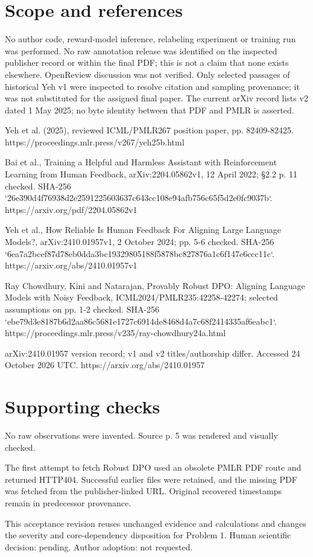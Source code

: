 \documentclass[10pt]{article}
\begin{document}
\section*{Scope and references}
No author code, reward-model inference, relabeling experiment or training run was performed. No raw annotation release was identified on the inspected publisher record or within the final PDF; this is not a claim that none exists elsewhere. OpenReview discussion was not verified. Only selected passages of historical Yeh v1 were inspected to resolve citation and sampling provenance; it was not substituted for the assigned final paper. The current arXiv record lists v2 dated 1 May 2025; no byte identity between that PDF and PMLR is asserted.\par
[S1] Yeh et al. (2025), reviewed ICML/PMLR267 position paper, pp. 82409-82425.
https://proceedings.mlr.press/v267/yeh25b.html\par
[S2] Bai et al., Training a Helpful and Harmless Assistant with Reinforcement Learning from Human Feedback, arXiv:2204.05862v1, 12 April 2022; §2.2 p. 11 checked. SHA-256 `26e390d4f76938d2e2591225603637c643cc108e94afb756c65f5d2e0fc9037b`.
https://arxiv.org/pdf/2204.05862v1\par
[S3] Yeh et al., How Reliable Is Human Feedback For Aligning Large Language Models?, arXiv:2410.01957v1, 2 October 2024; pp. 5-6 checked. SHA-256 `6ea7a2bcef87d78eb0dda3bc19329805188f5878bc827876a1c6f147e6ccc11c`.
https://arxiv.org/abs/2410.01957v1\par
[S4] Ray Chowdhury, Kini and Natarajan, Provably Robust DPO: Aligning Language Models with Noisy Feedback, ICML2024/PMLR235:42258-42274; selected assumptions on pp. 1-2 checked. SHA-256 `ebe79d3e8187b6d2aa86c5681e1727c6914de8468d4a7c68f2414335af6eabc1`.
https://proceedings.mlr.press/v235/ray-chowdhury24a.html\par
[S5] arXiv:2410.01957 version record; v1 and v2 titles/authorship differ. Accessed 24 October 2026 UTC.
https://arxiv.org/abs/2410.01957\par
\section*{Supporting checks}
No raw observations were invented. Source p. 5 was rendered and visually checked.\par
The first attempt to fetch Robust DPO used an obsolete PMLR PDF route and returned HTTP404. Successful earlier files were retained, and the missing PDF was fetched from the publisher-linked URL. Original recovered timestamps remain in predecessor provenance.\par
This acceptance revision reuses unchanged evidence and calculations and changes the severity and core-dependency disposition for Problem 1. Human scientific decision: pending. Author adoption: not requested.\par
\end{document}
